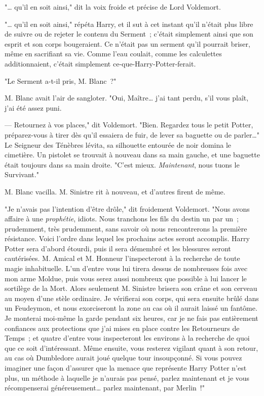"… qu'il en soit ainsi," dit la voix froide et précise de Lord Voldemort.

"… qu'il en soit ainsi," répéta Harry, et il sut à cet instant qu'il n'était plus libre de suivre ou de rejeter le contenu du Serment~; c'était simplement ainsi que son esprit et son corps bougeraient. Ce n'était pas un serment qu'il pourrait briser, même en sacrifiant sa vie. Comme l'eau coulait, comme les calculettes additionnaient, c'était simplement ce-que-Harry-Potter-ferait.

"Le Serment a-t-il pris, M. Blanc~?"

M. Blanc avait l'air de sangloter. "Oui, Maître… j'ai tant perdu, s'il vous plaît, j'ai été assez puni.

--- Retournez à vos places," dit Voldemort. "Bien. Regardez tous le petit Potter, préparez-vous à tirer dès qu'il essaiera de fuir, de lever sa baguette ou de parler…" Le Seigneur des Ténèbres lévita, sa silhouette entourée de noir domina le cimetière. Un pistolet se trouvait à nouveau dans sa main gauche, et une baguette était toujours dans sa main droite. "C'est mieux. \emph{Maintenant}, nous tuons le Survivant."

M. Blanc vacilla. M. Sinistre rit à nouveau, et d'autres firent de même.

"Je n'avais pas l'intention d'être drôle," dit froidement Voldemort. "Nous avons affaire à une \emph{prophétie}, idiots. Nous tranchons les fils du destin un par un~; prudemment, très prudemment, sans savoir où nous rencontrerons la première résistance. Voici l'ordre dans lequel les prochains actes seront accomplis. Harry Potter sera d'abord étourdi, puis il sera démembré et les blessures seront cautérisées. M. Amical et M. Honneur l'inspecteront à la recherche de toute magie inhabituelle. L'un d'entre vous lui tirera dessus de nombreuses fois avec mon arme Moldue, puis vous serez aussi nombreux que possible à lui lancer le sortilège de la Mort. Alors seulement M. Sinistre brisera son crâne et son cerveau au moyen d'une stèle ordinaire. Je vérifierai son corps, qui sera ensuite brûlé dans un Feudeymon, et nous exorciseront la zone au cas où il aurait laissé un fantôme. Je monterai moi-même la garde pendant six heures, car je ne fais pas entièrement confiances aux protections que j'ai mises en place contre les Retourneurs de Temps~; et quatre d'entre vous inspecteront les environs à la recherche de quoi que ce soit d'intéressant. Même ensuite, vous resterez vigilant quant à son retour, au cas où Dumbledore aurait joué quelque tour insoupçonné. Si vous pouvez imaginer une façon d'assurer que la menace que représente Harry Potter n'est plus, un méthode à laquelle je n'aurais pas pensé, parlez maintenant et je vous récompenserai généreusement… parlez maintenant, par Merlin~!"

